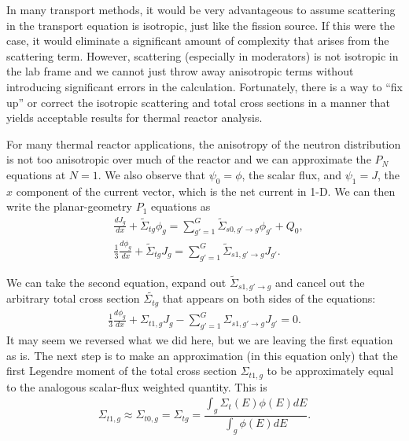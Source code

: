 In many transport methods, it would be very advantageous to assume scattering in the transport equation is isotropic, just like the fission source. If this were the case, it would eliminate a significant amount of complexity that arises from the scattering term. However, scattering (especially in moderators) is not isotropic in the lab frame and we cannot just throw away anisotropic terms without introducing significant errors in the calculation. Fortunately, there is a way to ``fix up'' or correct the isotropic scattering and total cross sections in a manner that yields acceptable results for thermal reactor analysis.

For many thermal reactor applications, the anisotropy of the neutron distribution is not too anisotropic over much of the reactor and we can approximate the $P_N$ equations at $N = 1$. We also observe that $\psi_0 = \phi$, the scalar flux, and $\psi_1 = J$, the $x$ component of the current vector, which is the net current in 1-D. We can then write the planar-geometry $P_1$ equations as
\begin{subequations}
\begin{align}
  & \frac{dJ_g}{dx}  + \widetilde{\Sigma}_{tg} \phi_g = \sum_{g'=1}^G \widetilde{\Sigma}_{s0,g' \rightarrow g}\phi_{g'}  + Q_0 , \\
  &\frac{1}{3} \frac{d\phi_g}{dx} + \widetilde{\Sigma}_{tg} J_g = \sum_{g'=1}^G \widetilde{\Sigma}_{s1,g' \rightarrow g} J_{g'} .
\end{align}
\end{subequations}

We can take the second equation, expand out $\widetilde{\Sigma}_{s1,g' \rightarrow g}$ and cancel out the arbitrary total cross section $\widetilde{\Sigma_{tg}}$ that appears on both sides of the equations:
\begin{align}
  \frac{1}{3} \frac{d\phi_g}{dx} + \Sigma_{t1,g} J_g - \sum_{g'=1}^G \Sigma_{s1,g' \rightarrow g} J_{g'} = 0. \nonumber
\end{align}
It may seem we reversed what we did here, but we are leaving the first equation as is. The next step is to make an approximation (in this equation only) that the first Legendre moment of the total cross section $\Sigma_{t1,g}$ to be approximately equal to the analogous scalar-flux weighted quantity. This is
\begin{align}
  \Sigma_{t1,g} \approx \Sigma_{t0,g} = \Sigma_{tg} = \dfrac{ \displaystyle\int_g \Sigma_t(E) \phi(E) dE }{ \displaystyle\int_g \phi(E) dE } .
\end{align}

